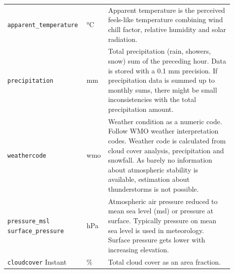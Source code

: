 \begin{longtable}[c]{p{0.3\linewidth}|p{0.07\linewidth}| p{0.54\linewidth}}
	\verb|apparent_temperature|                                                                                                                                                             & °C                      & Apparent temperature is the perceived feels-like temperature combining wind chill factor, relative humidity and solar radiation.                                                                                                                                                                       \\
	\verb|precipitation|                                                                                                                                                                    & mm                      & Total precipitation (rain, showers, snow) sum of the preceding hour. Data is stored with a 0.1 mm precision. If precipitation data is summed up to monthly sums, there might be small inconsistencies with the total precipitation amount.                                                             \\
	\verb|weathercode|                                                                                                                                                                      & wmo                     & Weather condition as a numeric code. Follow WMO weather interpretation codes. Weather code is calculated from cloud cover analysis, precipitation and snowfall. As barely no information about atmospheric stability is available, estimation about thunderstorms is not possible.                     \\
	\verb|pressure_msl| \verb|surface_pressure|                                                                                                                                             & hPa                     & Atmospheric air pressure reduced to mean sea level (msl) or pressure at surface. Typically pressure on mean sea level is used in meteorology. Surface pressure gets lower with increasing elevation.                                                                                                   \\

	\verb|cloudcover| 	Instant                                                                                                                                                              & \%                      & Total cloud cover as an area fraction.                                                                                                                                                                                                                                                                 \\


\end{longtable}
